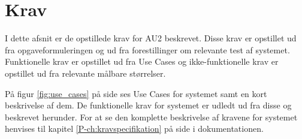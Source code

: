 \chapter{Krav}\label{ch:Krav} %

I dette afsnit er de opstillede krav for AU2 beskrevet.
Disse krav er opstillet ud fra opgaveformuleringen og ud fra forestillinger om relevante test af systemet. 
Funktionelle krav er opstillet ud fra Use Cases og ikke-funktionelle krav er opstillet ud fra relevante målbare størrelser.

På figur \ref{fig:use_cases} på side \pageref{fig:use_cases} ses Use Cases for systemet samt en kort beskrivelse af dem. 
De funktionelle krav for systemet er udledt ud fra disse og beskrevet herunder. 
For at se den komplette beskrivelse af kravene for systemet henvises til kapitel \ref{P-ch:kravspecifikation}  på side \pageref{P-ch:kravspecifikation} i dokumentationen.

